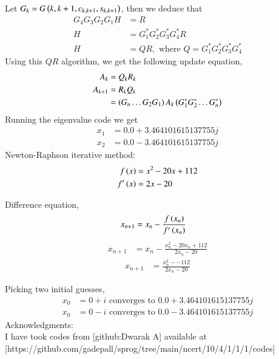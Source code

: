 \documentclass[journal]{IEEEtran}
\begin{document}
Let $G_k = G\left(k, k + 1, c_{k, k+1}, s_{k, k+1}\right)$, then we deduce that
\begin{align}
	G_4 G_3 G_2 G_1 H &= R\\
	H &= G_1^{\ast} G_2^{\ast} G_3^{\ast} G_4^{\ast} R\\
	H &= QR, \text{ where } Q = G_1^{\ast} G_2^{\ast} G_3^{\ast} G_4^{\ast}
\end{align}
Using this $QR$ algorithm, we get the following update equation,
\begin{align}
	A_{k} &= Q_{k}R_{k}\\
	A_{k + 1} &= R_{k}Q_{k}\\
	&= \left(G_{n}\dots G_{2} G_{1}\right) A_{k} \left(G_1^{\ast} G_2^{\ast} \dots G_n^{\ast}\right)
\end{align}
Running the eigenvalue code we get
\begin{align}
	x_1 &= 0.0 + 3.464101615137755j
\end{align}
\begin{align}
	x_2 &= 0.0 - 3.464101615137755j
\end{align}
Newton-Raphson iterative method:
\begin{align}
    f\left(x\right) &= x^2 -20x + 112\\
    f^\prime\left(x\right) &= 2x - 20
\end{align}

Difference equation,
\begin{align}
    x_{n+1} &= x_n - \frac{f\left(x_{n}\right)}{f^\prime\left(x_n\right)}
\end{align}
\begin{align}
    x_{n+1} &= x_n - \frac{x_n^2 -20x_n + 112}{2x_n - 20}
\end{align}
\begin{align}
    x_{n+1} &= \frac{x_n^2- -112}{2x_n -20}
\end{align}

Picking two initial guesses,
\begin{align}
    x_0 &= 0 + i \text{ converges to } 0.0 + 3.464101615137755j
\end{align}
\begin{align}
    x_0 &= 0 - i \text{ converges to } 0.0 - 3.464101615137755j
\end{align}
Acknowledgments:\\  
I have took codes from [github:Dwarak A] available at [https://github.com/gadepall/sprog/tree/main/ncert/10/4/1/1/1/codes]
\end{document}
